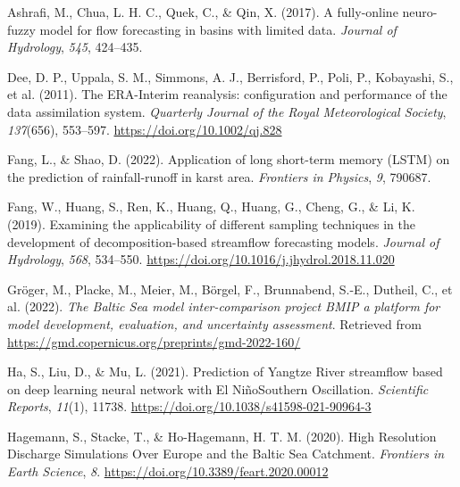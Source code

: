 \documentclass[
]{agujournal2019}
\newlength{\cslhangindent}
\newenvironment{CSLReferences}[2] %
 {\begin{list}{}{%
  \setlength{\itemindent}{0pt}
  \setlength{\leftmargin}{0pt}
  \setlength{\parsep}{0pt}
  \ifodd #1
   \setlength{\leftmargin}{\cslhangindent}
   \setlength{\itemindent}{-1\cslhangindent}
  \fi
  \setlength{\itemsep}{#2\baselineskip}}}
 {\end{list}}
\begin{document}
\label{refs}
\begin{CSLReferences}{1}{0}
\vspace{1em}

Ashrafi, M., Chua, L. H. C., Quek, C., \& Qin, X. (2017). A fully-online
neuro-fuzzy model for flow forecasting in basins with limited data.
\emph{Journal of Hydrology}, \emph{545}, 424--435.

Dee, D. P., Uppala, S. M., Simmons, A. J., Berrisford, P., Poli, P.,
Kobayashi, S., et al. (2011). The ERA-Interim reanalysis: configuration
and performance of the data assimilation system. \emph{Quarterly Journal
of the Royal Meteorological Society}, \emph{137}(656), 553--597.
\url{https://doi.org/10.1002/qj.828}

Fang, L., \& Shao, D. (2022). Application of long short-term memory
(LSTM) on the prediction of rainfall-runoff in karst area.
\emph{Frontiers in Physics}, \emph{9}, 790687.

Fang, W., Huang, S., Ren, K., Huang, Q., Huang, G., Cheng, G., \& Li, K.
(2019). Examining the applicability of different sampling techniques in
the development of decomposition-based streamflow forecasting models.
\emph{Journal of Hydrology}, \emph{568}, 534--550.
\url{https://doi.org/10.1016/j.jhydrol.2018.11.020}

Gröger, M., Placke, M., Meier, M., Börgel, F., Brunnabend, S.-E.,
Dutheil, C., et al. (2022). \emph{The Baltic Sea model inter-comparison
project BMIP {\textendash} a platform for model development, evaluation,
and uncertainty assessment}. Retrieved from
\url{https://gmd.copernicus.org/preprints/gmd-2022-160/}

Ha, S., Liu, D., \& Mu, L. (2021). Prediction of Yangtze River
streamflow based on deep learning neural network with El
Niño{\textendash}Southern Oscillation. \emph{Scientific Reports},
\emph{11}(1), 11738. \url{https://doi.org/10.1038/s41598-021-90964-3}

Hagemann, S., Stacke, T., \& Ho-Hagemann, H. T. M. (2020). High
{Resolution Discharge Simulations Over Europe} and the {Baltic Sea
Catchment}. \emph{Frontiers in Earth Science}, \emph{8}.
\url{https://doi.org/10.3389/feart.2020.00012}


\end{CSLReferences}
\end{document}
